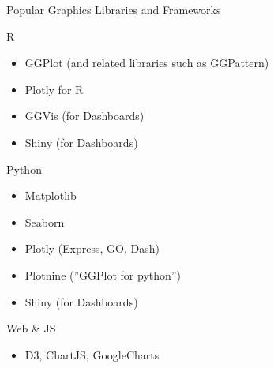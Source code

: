 \documentclass[ignorenonframetext,xcolor=x11names]{beamer}
\begin{document}


\begin{frame}{Popular Graphics Libraries and Frameworks}
\begin{block}{R}
\begin{itemize}
  \item GGPlot (and related libraries such as GGPattern)
  \item Plotly for R
  \item GGVis (for Dashboards)
  \item Shiny (for Dashboards)
\end{itemize}
\end{block}
\begin{block}{Python}
\begin{itemize}
  \item Matplotlib
  \item Seaborn
  \item Plotly (Express, GO, Dash)
  \item Plotnine (''GGPlot for python'')
  \item Shiny (for Dashboards)
\end{itemize}
\end{block}
\begin{block}{Web \& JS}
\begin{itemize}
  \item D3, ChartJS, GoogleCharts
\end{itemize}
\end{block}
\end{frame}
\end{document}
